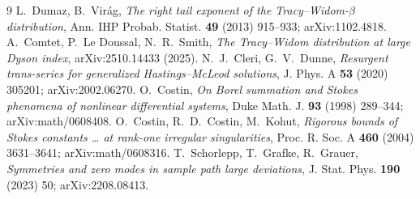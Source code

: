 \documentclass[11pt,reqno]{amsart}
\theoremstyle{plain}
\theoremstyle{remark}
\begin{document}
\begin{thebibliography}{9}
 L.~Dumaz, B.~Vir\'ag, \emph{The right tail exponent of the Tracy--Widom-$\beta$
distribution}, Ann. IHP Probab. Statist. \textbf{49} (2013) 915--933; arXiv:1102.4818.
 A.~Comtet, P.~Le Doussal, N.~R.~Smith, \emph{The Tracy--Widom distribution at
large Dyson index}, arXiv:2510.14433 (2025).
 N.~J.~Cleri, G.~V.~Dunne, \emph{Resurgent trans-series for generalized
Hastings--McLeod solutions}, J. Phys. A \textbf{53} (2020) 305201; arXiv:2002.06270.
 O.~Costin, \emph{On Borel summation and Stokes phenomena of nonlinear
differential systems}, Duke Math. J. \textbf{93} (1998) 289--344; arXiv:math/0608408.
 O.~Costin, R.~D.~Costin, M.~Kohut, \emph{Rigorous bounds of Stokes constants \dots
at rank-one irregular singularities}, Proc. R. Soc. A \textbf{460} (2004) 3631--3641;
arXiv:math/0608316.
 T.~Schorlepp, T.~Grafke, R.~Grauer, \emph{Symmetries and zero modes in sample path
large deviations}, J. Stat. Phys. \textbf{190} (2023) 50; arXiv:2208.08413.
\end{thebibliography}
\end{document}
